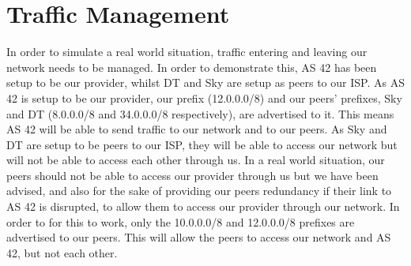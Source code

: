 \section{Traffic Management} In order to simulate a real world situation,
traffic entering and leaving our network needs to be managed. In order to
demonstrate this, AS 42 has been setup to be our provider, whilst DT and Sky are
setup as peers to our ISP. As AS 42 is setup to be our provider, our prefix
(12.0.0.0/8) and our peers' prefixes, Sky and DT (8.0.0.0/8 and 34.0.0.0/8
respectively), are advertised to it. This means AS 42 will be able to send
traffic to our network and to our peers. As Sky and DT are setup to be peers to
our ISP, they will be able to access our network but will not be able to access
each other through us. In a real world situation, our peers should not be able
to access our provider through us but we have been advised, and also for the
sake of providing our peers redundancy if their link to AS 42 is disrupted, to
allow them to access our provider through our network. In order to for this to
work, only the 10.0.0.0/8 and 12.0.0.0/8 prefixes are advertised to our peers.
This will allow the peers to access our network and AS 42, but not each other.
